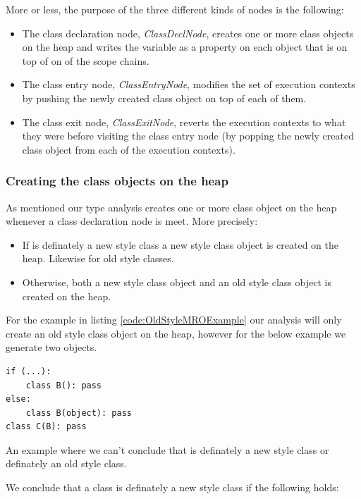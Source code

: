 More or less, the purpose of the three different kinds of nodes is the following:

\begin{itemize}
	\item The class declaration node, \textit{ClassDeclNode}, creates one or more class objects on the heap and writes the variable  as a property on each object that is on top of on of the scope chains.
	\item The class entry node, \textit{ClassEntryNode}, modifies the set of execution contexts by pushing the newly created class object on top of each of them.
	\item The class exit node, \textit{ClassExitNode}, reverts the execution contexts to what they were before visiting the class entry node (by popping the newly created class object from each of the execution contexts).
\end{itemize}

\subsubsection{Creating the class objects on the heap}
As mentioned our type analysis creates one or more class object on the heap whenever a class declaration node is meet. More precisely:

\begin{itemize}
	\item If  is definately a new style class a new style class object is created on the heap. Likewise for old style classes.
	\item Otherwise, both a new style class object and an old style class object is created on the heap.
\end{itemize}

For the example in listing \ref{code:OldStyleMROExample} our analysis will only create an old style class object on the heap, however for the below example we generate two objects.

\begin{listing}[H]
	\begin{verbatim}
if (...):
	class B(): pass
else:
	class B(object): pass
class C(B): pass
	\end{verbatim}
	\caption{An example where we can't conclude that  is definately a new style class or definately an old style class.}\label{code:NotDefinatelyNewOldStyleClass}
\end{listing}

We conclude that a class is definately a new style class if the following holds:

